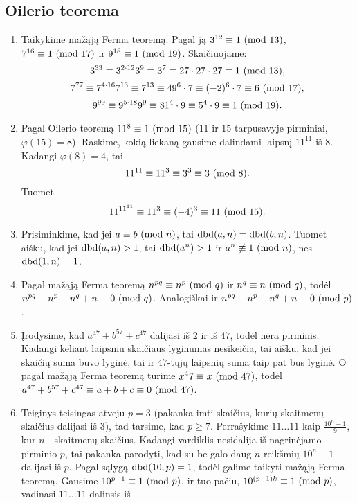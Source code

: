 \subsection*{Oilerio teorema}
\begin{enumerate}
\item
    Taikykime mažąją Ferma teoremą. Pagal ją $3^{12}\equiv 1 \ (\text{mod } 13)$,
    $7^{16} \equiv 1\ (\text{mod } 17)$ ir $9^{18} \equiv 1 \ (\text{mod } 19)$. Skaičiuojame:
    $$3^{33} \equiv 3^{2\cdot 12}3^{9} \equiv 3^7 \equiv 27\cdot 27\cdot
    27	 \equiv 1 \ (\text{mod } 13),$$
    $$7^{77} \equiv 7^{4\cdot 16}7^{13} \equiv 7^{13} \equiv 49^6\cdot 7
    \equiv (-2)^6 \cdot 7\equiv 6 \ (\text{mod } 17),$$
    $$9^{99} \equiv 9^{5 \cdot 18}9^9 \equiv 81^4\cdot 9 \equiv 5^4 \cdot 9
    \equiv 1 \ (\text{mod } 19).$$
\item
    Pagal Oilerio teoremą $11^{8} \equiv 1 \ (\text{mod } 15)$ ($11$ ir $15$
    tarpusavyje pirminiai, $\varphi(15)=8$). Raskime, kokią liekaną
    gausime dalindami laipsnį $11^{11}$ iš $8$. Kadangi $\varphi(8) = 4$,
    tai $$11^{11} \equiv 11^{3} \equiv 3^3 \equiv 3 \ (\text{mod } 8).$$ Tuomet
    $$11^{11^{11}} \equiv 11^3 \equiv (-4)^3 \equiv 11 \ (\text{mod } 15).$$
\item
    Prisiminkime, kad jei $a \equiv b \ (\text{mod } n)$, tai $\operatorname{dbd}(a,n) =
    \operatorname{dbd}(b,n)$. Tuomet aišku, kad jei $\operatorname{dbd}(a,n) > 1$, tai $\operatorname{dbd}(a^n) >1$
    ir $a^n \not \equiv 1\ (\text{mod } n)$, nes $\operatorname{dbd}(1,n)=1$.
\item
    Pagal mažąją Ferma teoremą $n^{pq} \equiv n^p \ (\text{mod } q)$ ir $n^q \equiv
    n \ (\text{mod } q)$, todėl $n^{pq} - n^p - n^q + n \equiv 0 \ (\text{mod } q)$. Analogiškai
    ir $n^{pq} - n^p - n^q +n \equiv 0 \ (\text{mod } p)$.
\item
    Įrodysime, kad $a^{47}+b^{57}+c^{47}$ dalijasi iš $2$ ir iš $47$,
    todėl nėra pirminis. Kadangi keliant laipsniu skaičiaus lyginumas
    nesikeičia, tai aišku, kad jei skaičių suma buvo lyginė, tai ir
    $47$-tųjų laipsnių suma taip pat bus lyginė. O pagal mažąją Ferma
    teoremą turime $x^47 \equiv x \ (\text{mod } 47)$, todėl $a^{47} + b^{57} +
    c^{47}\equiv a+b+c \equiv 0 \ (\text{mod } 47)$.
\item
    Teiginys teisingas atveju $p=3$ (pakanka imti skaičius, kurių
    skaitmenų skaičius dalijasi iš $3$), tad tarsime, kad $p\geq 7$.
    Perrašykime $11\dots11$ kaip $\frac{10^n-1}{9}$, kur $n$ - skaitmenų
    skaičius. Kadangi vardiklis nesidalija iš nagrinėjamo pirminio
    $p$, tai pakanka parodyti, kad su be galo daug $n$ reikšmių $10^n - 1$
    dalijasi iš $p$. Pagal sąlygą $\operatorname{dbd}(10,p)=1$, todėl galime taikyti
    mažąją Ferma teoremą. Gausime $10^{p-1} \equiv 1 \ (\text{mod } p)$, ir tuo pačiu,
    $10^{(p-1)k}\equiv 1\ (\text{mod } p)$, vadinasi $11\dots11$ dalinsis iš

\end{enumerate}
